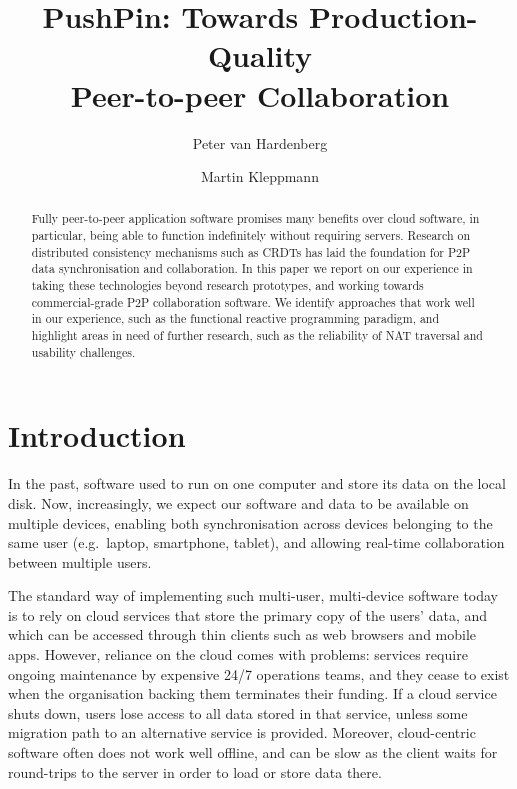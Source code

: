\documentclass[sigplan,10pt]{acmart}
\begin{document}
\title{PushPin: Towards Production-Quality \\Peer-to-peer Collaboration}

\author{Peter van Hardenberg}

\author{Martin Kleppmann}

\begin{abstract}
Fully peer-to-peer application software promises many benefits over cloud software, in particular, being able to function indefinitely without requiring servers.
Research on distributed consistency mechanisms such as CRDTs has laid the foundation for P2P data synchronisation and collaboration.
In this paper we report on our experience in taking these technologies beyond research prototypes, and working towards commercial-grade P2P collaboration software.
We identify approaches that work well in our experience, such as the functional reactive programming paradigm, and highlight areas in need of further research, such as the reliability of NAT traversal and usability challenges.
\end{abstract}

\maketitle

\section{Introduction}

In the past, software used to run on one computer and store its data on the local disk.
Now, increasingly, we expect our software and data to be available on multiple devices, enabling both synchronisation across devices belonging to the same user (e.g.\ laptop, smartphone, tablet), and allowing real-time collaboration between multiple users.

The standard way of implementing such multi-user, multi-device software today is to rely on cloud services that store the primary copy of the users' data, and which can be accessed through thin clients such as web browsers and mobile apps.
However, reliance on the cloud comes with problems: services require ongoing maintenance by expensive 24/7 operations teams, and they cease to exist when the organisation backing them terminates their funding.
If a cloud service shuts down, users lose access to all data stored in that service, unless some migration path to an alternative service is provided.
Moreover, cloud-centric software often does not work well offline, and can be slow as the client waits for round-trips to the server in order to load or store data there.
\end{document}
